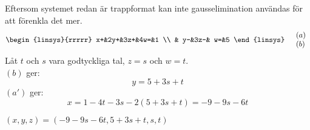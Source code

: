 \begin{task}{1.15}
	Eftersom systemet redan är trappformat kan inte gausselimination användas för att förenkla det mer.
	\begin{align*}
		&\begin{linsys}{rrrrr}
			x+&2y+&3z+&4w=&1 \\
			  & y-&3z-& w=&5
		\end{linsys}
		&\begin{array}{l} 
			(a) \\ 
			(b) 
		\end{array}
	\end{align*}
	Låt $t$ och $s$ vara godtyckliga tal, $z=s$ och $w=t$. \\
	$(b)$ ger:
	\[y=5+3s+t\]
	$(a')$ ger:
	\[x=1-4t-3s-2(5+3s+t)=-9-9s-6t\]

	\ans $(x,y,z)=(-9-9s-6t,5+3s+t,s,t)$
\end{task}

